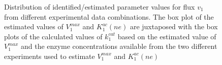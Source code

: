 \documentclass[10pt]{article}
\begin{document}
\begin{figure}[!tbhp]
	\caption{Distribution of identified/estimated parameter values for flux $v_1$ from different experimental data combinations. The box plot of the estimated values of $V_1^{max}$ and $K_1^{ac}(ne)$ are juxtaposed with the box plots of the calculated values of $k_1^{cat}$ based on the estimated value of $V_1^{max}$ and the enzyme concentrations available from the two different experiments used to estimate $V_1^{max}$ and $K_1^{ac}(ne)$}\label{fig:parameter_value_v1_v1max_kcat}
\end{figure}	

\clearpage



\printbibliography
\end{document}
